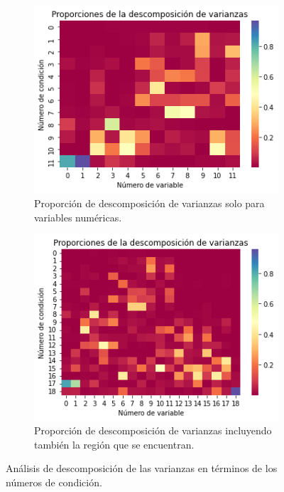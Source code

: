 \documentclass[a4paper,12pt]{amsart}
\begin{document}
    \begin{figure}[!ht]
        \begin{subfigure}{0.49\linewidth}
            \includegraphics[width=\linewidth]{Images/VDM.png}
            \caption{Proporción de descomposición de varianzas solo para variables numéricas.}
        \end{subfigure}
        \begin{subfigure}{0.49\linewidth}
            \includegraphics[width=\linewidth]{Images/VDM_adjusted.png}
            \caption{Proporción de descomposición de varianzas incluyendo también la región que se encuentran.}
        \end{subfigure}
        \caption{Análisis de descomposición de las varianzas en términos de los números de condición.}\label{fig:pis}
    \end{figure}
\end{document}
